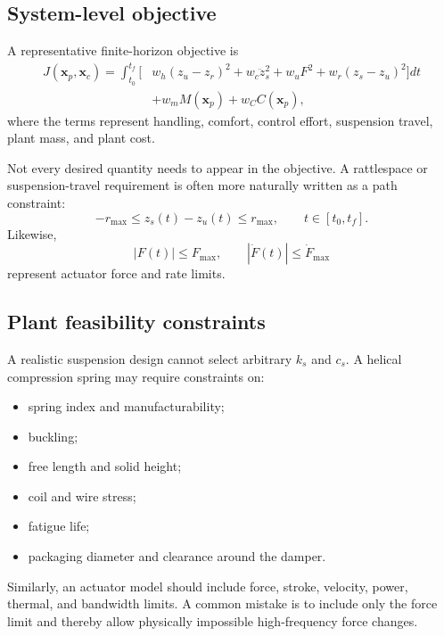 \documentclass[11pt]{article}
\newcommand{\vect}[1]{\boldsymbol{#1}}
\newcommand{\xp}{\vect{x}_p}
\newcommand{\xc}{\vect{x}_c}
\begin{document}
\subsection{System-level objective}

A representative finite-horizon objective is
\begin{align}
J(\xp,\xc) = \int_{t_0}^{t_f} \Big[ &w_h(z_u-z_r)^2
+w_c\ddot z_s^2+w_uF^2 
+w_r(z_s-z_u)^2\Big]dt \\
&+w_m M(\xp)+w_C C(\xp),
\label{eq:suspension-objective}
\end{align}
where the terms represent handling, comfort, control effort, suspension travel, plant mass, and plant cost.

Not every desired quantity needs to appear in the objective. A rattlespace or suspension-travel requirement is often more naturally written as a path constraint:
\begin{equation}
-r_{\max}\le z_s(t)-z_u(t)\le r_{\max}, \qquad t\in[t_0,t_f].
\label{eq:rattlespace}
\end{equation}
Likewise,
\begin{equation}
|F(t)|\le F_{\max}, \qquad |\dot F(t)|\le \dot F_{\max}
\end{equation}
represent actuator force and rate limits.

\subsection{Plant feasibility constraints}

A realistic suspension design cannot select arbitrary $k_s$ and $c_s$. A helical compression spring may require constraints on:
\begin{itemize}[leftmargin=1.4em]
  \item spring index and manufacturability;
  \item buckling;
  \item free length and solid height;
  \item coil and wire stress;
  \item fatigue life;
  \item packaging diameter and clearance around the damper.
\end{itemize}

Similarly, an actuator model should include force, stroke, velocity, power, thermal, and bandwidth limits. A common mistake is to include only the force limit and thereby allow physically impossible high-frequency force changes.
\end{document}
